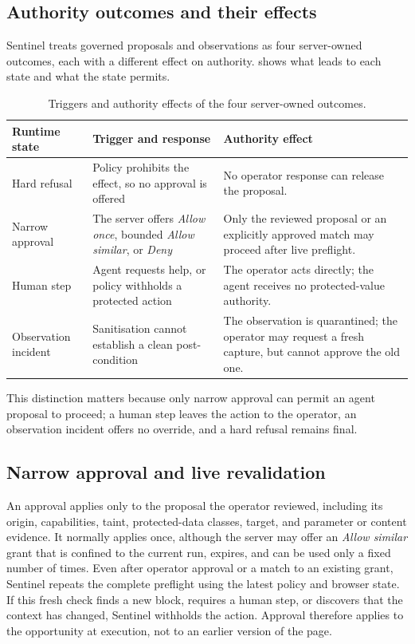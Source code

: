 \subsection{Authority outcomes and their effects}

Sentinel treats governed proposals and observations as four server-owned
outcomes, each with a different effect on authority.
 shows what leads to each state and what the state
permits.

\begin{table}[!htbp]
\centering
\caption{Triggers and authority effects of the four server-owned outcomes.}
\label{tab:authority-taxonomy}
\footnotesize
\renewcommand{\arraystretch}{1.03}
\begin{tabularx}{\textwidth}{@{}L{0.18\textwidth}L{0.29\textwidth}Y@{}}
\toprule
Runtime state & Trigger and response & Authority effect \\
\midrule
Hard refusal & Policy prohibits the effect, so no approval is offered &
No operator response can release the proposal. \\
Narrow approval & The server offers \emph{Allow once}, bounded \emph{Allow
similar}, or \emph{Deny} &
Only the reviewed proposal or an explicitly approved match may proceed after
live preflight. \\
Human step & Agent requests help, or policy withholds a protected action &
The operator acts directly; the agent receives no protected-value authority. \\
\addlinespace[0.25em]
Observation incident & Sanitisation cannot establish a clean post-condition &
The observation is quarantined; the operator may request a fresh capture, but
cannot approve the old one. \\
\bottomrule
\end{tabularx}
\end{table}
\FloatBarrier

This distinction matters because only narrow approval can permit an agent
proposal to proceed; a human step leaves the action to the operator, an
observation incident offers no override, and a hard refusal remains final.

\subsection{Narrow approval and live revalidation}

An approval applies only to the proposal the operator reviewed, including its
origin, capabilities, taint, protected-data classes, target, and parameter or
content evidence. It normally applies once, although the server may offer an
\emph{Allow similar} grant that is confined to the current run, expires, and can
be used only a fixed number of times. Even after operator approval or a match to
an existing grant, Sentinel repeats the complete preflight using the latest
policy and browser state. If this fresh check finds a new block, requires a
human step, or discovers that the context has changed, Sentinel withholds the
action. Approval therefore applies to the opportunity at execution, not to an
earlier version of the page.

